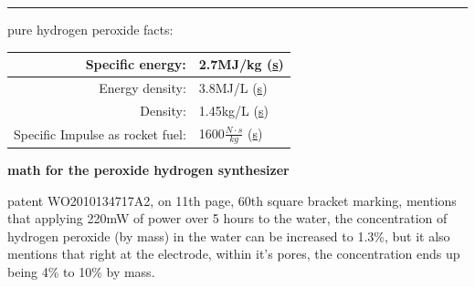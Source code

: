 \documentclass[a4paper]{article}
\begin{document}
	
	
	
	\noindent\rule{\linewidth}{0.5pt}
	
	\begin{center}
		pure hydrogen peroxide facts:
		
		\medskip
		
		\begin{tabular}{r | l}
			Specific energy: & 2.7MJ/kg (\href{https://en.wikipedia.org/wiki/Energy_density_Extended_Reference_Table}{s}) \\\hline
			Energy density: & 3.8MJ/L (\href{https://en.wikipedia.org/wiki/Energy_density_Extended_Reference_Table}{s}) \\\hline
			Density: & 1.45kg/L (\href{https://en.wikipedia.org/wiki/Hydrogen_peroxide}{s}) \\ \hline
			Specific Impulse as rocket fuel: & 1600$\frac{N \cdot s}{kg}$ (\href{https://en.wikipedia.org/wiki/Hydrogen_peroxide#Propellant}{s})
		\end{tabular}
	\end{center}
	
	\pagebreak
	
	\footnotesize
	
	\begin{center}
		\textbf{math for the peroxide hydrogen synthesizer}
	\end{center}
	
	patent WO2010134717A2, on 11th page, 60th square bracket marking, mentions that applying 220mW of power over 5 hours to the water, the concentration of hydrogen peroxide (by mass) in the water can be increased to 1.3\%, but it also mentions that right at the electrode, within it's pores, the concentration ends up being 4\% to 10\% by mass.
	
\end{document}
